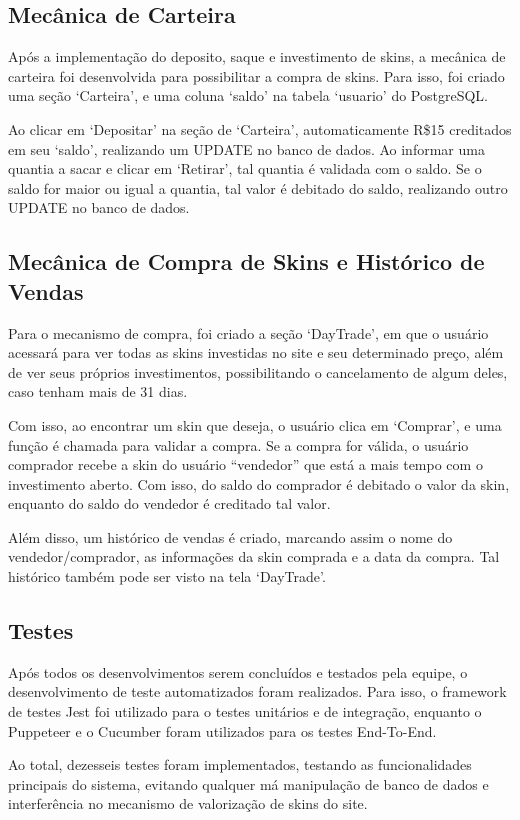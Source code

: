 \subsection{Mecânica de Carteira}
Após a implementação do deposito, saque e investimento de skins, a mecânica de carteira foi 
desenvolvida para possibilitar a compra de skins. Para isso, foi criado uma seção ‘Carteira’, e 
uma coluna ‘saldo’ na tabela ‘usuario’ do PostgreSQL. 

Ao clicar em ‘Depositar’ na seção de ‘Carteira’, automaticamente R\$15 creditados em seu ‘saldo’, 
realizando um UPDATE no banco de dados. Ao informar uma quantia a sacar e clicar em ‘Retirar’, tal 
quantia é validada com o saldo. Se o saldo for maior ou igual a quantia, tal valor é debitado do 
saldo, realizando outro UPDATE no banco de dados.

\subsection{Mecânica de Compra de Skins e Histórico de Vendas}
Para o mecanismo de compra, foi criado a seção ‘DayTrade’, em que o usuário 
acessará para ver todas as skins investidas no site e seu determinado preço, além 
de ver seus próprios investimentos, possibilitando o cancelamento de algum deles, 
caso tenham mais de 31 dias.

Com isso, ao encontrar um skin que deseja, o usuário clica em ‘Comprar’, e uma função é 
chamada para validar a compra. Se a compra for válida, o usuário comprador recebe a skin 
do usuário “vendedor” que está a mais tempo com o investimento aberto. Com isso, do saldo do 
comprador é debitado o valor da skin, enquanto do saldo do vendedor é creditado tal valor. 

Além disso, um histórico de vendas é criado, marcando assim o nome do vendedor/comprador, as 
informações da skin comprada e a data da compra. Tal histórico também pode ser visto na tela 
‘DayTrade’.

\subsection{Testes}
Após todos os desenvolvimentos serem concluídos e testados pela equipe, o desenvolvimento de 
teste automatizados foram realizados. Para isso, o framework de testes Jest foi utilizado para 
o testes unitários e de integração, enquanto o Puppeteer e o Cucumber foram utilizados para os 
testes End-To-End. 

Ao total, dezesseis testes foram implementados, testando as funcionalidades principais do sistema, 
evitando qualquer má manipulação de banco de dados e interferência no mecanismo de valorização de
skins do site.

